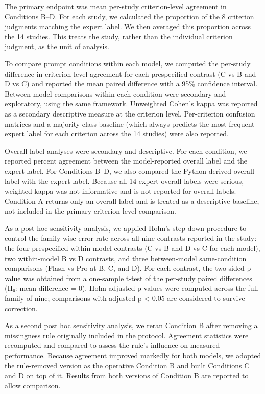\documentclass[11pt,a4paper]{article}
\begin{document}
The primary endpoint was mean per-study criterion-level agreement in Conditions B–D. For each study, we calculated the proportion of the 8 criterion judgments matching the expert label. We then averaged this proportion across the 14 studies. This treats the study, rather than the individual criterion judgment, as the unit of analysis.

To compare prompt conditions within each model, we computed the per-study difference in criterion-level agreement for each prespecified contrast (C vs B and D vs C) and reported the mean paired difference with a 95\% confidence interval. Between-model comparisons within each condition were secondary and exploratory, using the same framework. Unweighted Cohen's kappa was reported as a secondary descriptive measure at the criterion level. Per-criterion confusion matrices and a majority-class baseline (which always predicts the most frequent expert label for each criterion across the 14 studies) were also reported.

Overall-label analyses were secondary and descriptive. For each condition, we reported percent agreement between the model-reported overall label and the expert label. For Conditions B–D, we also compared the Python-derived overall label with the expert label. Because all 14 expert overall labels were serious, weighted kappa was not informative and is not reported for overall labels. Condition A returns only an overall label and is treated as a descriptive baseline, not included in the primary criterion-level comparison.

As a post hoc sensitivity analysis, we applied Holm's step-down procedure to control the family-wise error rate across all nine contrasts reported in the study: the four prespecified within-model contrasts (C vs B and D vs C for each model), two within-model B vs D contrasts, and three between-model same-condition comparisons (Flash vs Pro at B, C, and D). For each contrast, the two-sided p-value was obtained from a one-sample t-test of the per-study paired differences (H₀: mean difference = 0). Holm-adjusted p-values were computed across the full family of nine; comparisons with adjusted p < 0.05 are considered to survive correction.

As a second post hoc sensitivity analysis, we reran Condition B after removing a missingness rule originally included in the protocol. Agreement statistics were recomputed and compared to assess the rule's influence on measured performance. Because agreement improved markedly for both models, we adopted the rule-removed version as the operative Condition B and built Conditions C and D on top of it. Results from both versions of Condition B are reported to allow comparison.
\end{document}
